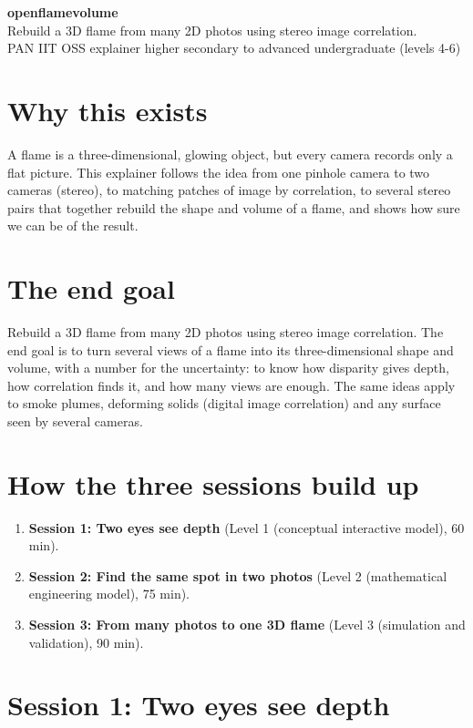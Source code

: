 \documentclass[11pt,a4paper]{article}
\begin{document}
\begin{center}{\LARGE\bfseries openflamevolume}\\[0.4em]{\large Rebuild a 3D flame from many 2D photos using stereo image correlation.}\\[0.2em]\small PAN IIT OSS explainer \textbullet{} higher secondary to advanced undergraduate (levels 4-6)\end{center}

\section*{Why this exists}
A flame is a three-dimensional, glowing object, but every camera records only a flat picture. This explainer follows the idea from one pinhole camera to two cameras (stereo), to matching patches of image by correlation, to several stereo pairs that together rebuild the shape and volume of a flame, and shows how sure we can be of the result.

\section*{The end goal}
Rebuild a 3D flame from many 2D photos using stereo image correlation. The end goal is to turn several views of a flame into its three-dimensional shape and volume, with a number for the uncertainty: to know how disparity gives depth, how correlation finds it, and how many views are enough. The same ideas apply to smoke plumes, deforming solids (digital image correlation) and any surface seen by several cameras.

\section*{How the three sessions build up}
\begin{enumerate}[nosep]
\item \textbf{Session 1: Two eyes see depth} (Level 1 (conceptual interactive model), 60 min).
\item \textbf{Session 2: Find the same spot in two photos} (Level 2 (mathematical engineering model), 75 min).
\item \textbf{Session 3: From many photos to one 3D flame} (Level 3 (simulation and validation), 90 min).
\end{enumerate}

\section{Session 1: Two eyes see depth}
\end{document}
